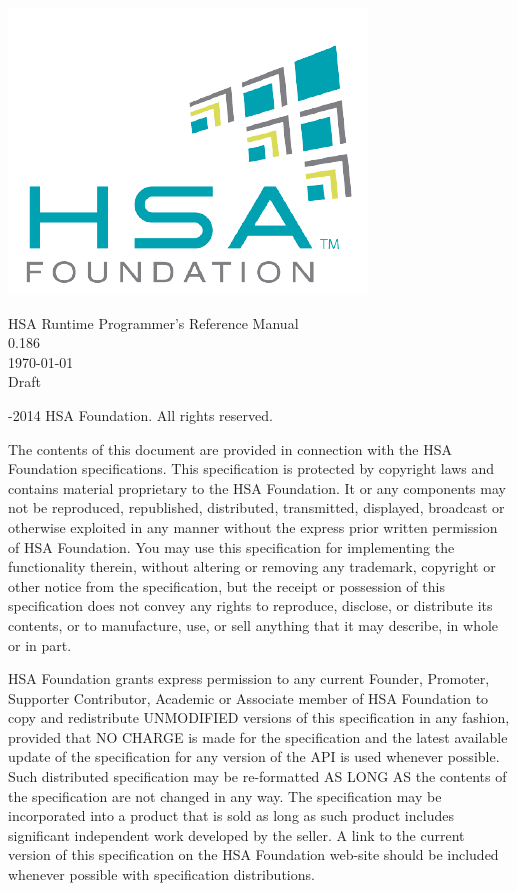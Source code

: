 \documentclass[final]{book}
\newcommand{\doctitle}{HSA Runtime Programmer's Reference Manual}
\newcommand{\docversion}{0.186}
\begin{document}
\begin{titlepage}
\includegraphics[width=.4\textwidth]{fig/foundation_small.png}
\vspace*{7cm}
\begin{center}
{\Large \doctitle\\[1ex]\large\docversion}\\
\vspace*{1cm}
\vspace*{0.5cm}
{\small \today}\\
\vspace*{0.5cm}
{\small Draft}\\
\end{center}
\end{titlepage}
\thispagestyle{empty} {-2014 HSA Foundation. All rights
  reserved.}


The contents of this document are provided in connection with the HSA Foundation
specifications. This specification is protected by copyright laws and contains
material proprietary to the HSA Foundation. It or any components may not be
reproduced, republished, distributed, transmitted, displayed, broadcast or
otherwise exploited in any manner without the express prior written permission
of HSA Foundation. You may use this specification for implementing the
functionality therein, without altering or removing any trademark, copyright or
other notice from the specification, but the receipt or possession of this
specification does not convey any rights to reproduce, disclose, or distribute
its contents, or to manufacture, use, or sell anything that it may describe, in
whole or in part.

HSA Foundation grants express permission to any current Founder, Promoter,
Supporter Contributor, Academic or Associate member of HSA Foundation to copy
and redistribute UNMODIFIED versions of this specification in any fashion,
provided that NO CHARGE is made for the specification and the latest available
update of the specification for any version of the API is used whenever
possible. Such distributed specification may be re-formatted AS LONG AS the
contents of the specification are not changed in any way. The specification may
be incorporated into a product that is sold as long as such product includes
significant independent work developed by the seller. A link to the current
version of this specification on the HSA Foundation web-site should be included
whenever possible with specification distributions.
\end{document}
